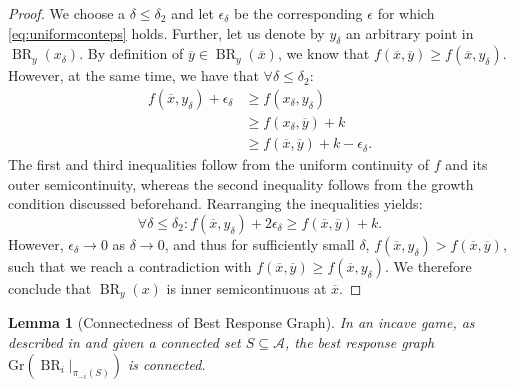 \documentclass{article}
\newtheorem{lemma}{Lemma}
\DeclareMathOperator{\BR}{BR}
\newcommand{\Gr}{\text{Gr}}
\begin{document}
\begin{proof}
We choose a $\delta\leq \delta_2$ and let $\epsilon_\delta$ be the corresponding $\epsilon$ for which \eqref{eq:uniformconteps} holds. Further, let us denote by $y_\delta$ an arbitrary point in $\BR_y(x_{\delta})$. By definition of $\overline{y}\in \BR_y(\overline{x})$, we know that $f(\overline{x},\overline{y})\geq f(\overline{x},y_\delta)$. However, at the same time, we have that $\forall \delta \leq \delta_2$:
\begin{align*}
    f(\overline{x},y_{\delta})+ \epsilon_\delta &\geq f(x_\delta,y_\delta)\\
    &\geq f(x_\delta,\overline{y}) + k\\
    &\geq f(\overline{x},\overline{y}) + k - \epsilon_\delta.
\end{align*}
The first and third inequalities follow from the uniform continuity of $f$ and its outer semicontinuity, whereas the second inequality follows from the growth condition discussed beforehand. Rearranging the inequalities yields:
\[
\forall \delta \leq \delta_2: f(\overline{x},y_\delta) + 2 \epsilon_\delta \geq f(\overline{x},\overline{y}) + k.
\]
However, $\epsilon_\delta \to 0$ as $\delta \to 0$, and thus for sufficiently small $\delta$, $f(\overline{x},y_\delta) > f(\overline{x},\overline{y}) $, 
 such that we reach a contradiction with $f(\overline{x},\overline{y})\geq f(\overline{x},y_\delta)$. We therefore conclude that $\BR_y(x)$ is inner semicontinuous at $\overline{x}$.
\end{proof}


\begin{lemma}[Connectedness of Best Response Graph]
    \label{lem:connectedBRgraph}
    In an incave game, as described in  and given a connected set $S\subseteq \mathcal{A}$, the best response graph $\Gr(\BR_i|_{\pi_{-i}(S)})$ is connected. 
\end{lemma}
\end{document}
